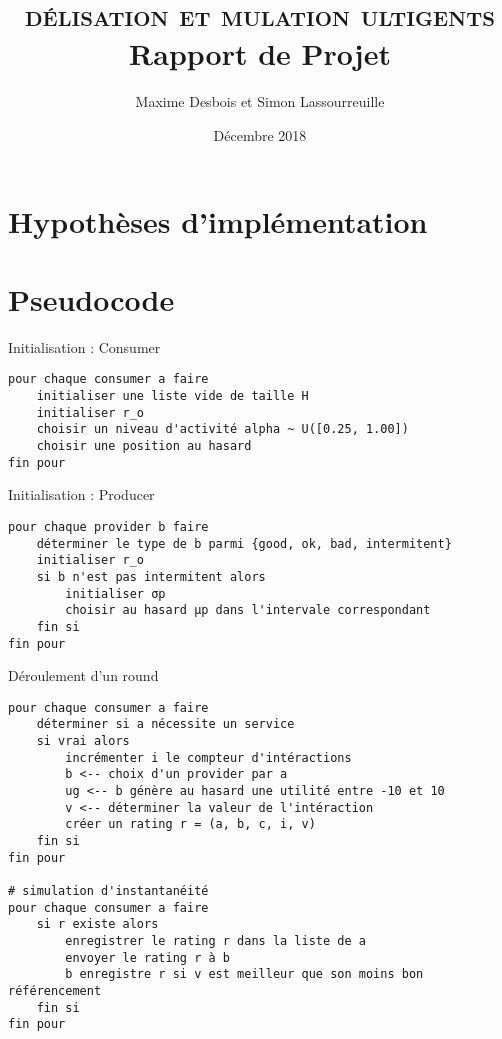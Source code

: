 \documentclass{article}
\title{%
    \vspace*{\fill}
    \textbf{\scshape \tcol{Mo}délisation et \tcol{Si}mulation \tcol{M}ulti\tcol{A}gents}\\
    Rapport de Projet
}
\author{
    Maxime Desbois et Simon Lassourreuille
}
\date{
    Décembre 2018
    \vspace*{\fill}
}
\begin{document}
\maketitle

\clearpage

\section{Hypothèses d'implémentation}%
\label{sec:hypotheses_d_implementation}



\section{Pseudocode}

\begin{pseudocode}{Initialisation : Consumer}
\begin{verbatim}
pour chaque consumer a faire
    initialiser une liste vide de taille H
    initialiser r_o
    choisir un niveau d'activité alpha ~ U([0.25, 1.00])
    choisir une position au hasard
fin pour
\end{verbatim}
\end{pseudocode}

\begin{pseudocode}{Initialisation : Producer}
\begin{verbatim}
pour chaque provider b faire
    déterminer le type de b parmi {good, ok, bad, intermitent}
    initialiser r_o
    si b n'est pas intermitent alors
        initialiser σp
        choisir au hasard μp dans l'intervale correspondant
    fin si
fin pour
\end{verbatim}
\end{pseudocode}

\begin{pseudocode}{Déroulement d'un round}
\begin{verbatim}
pour chaque consumer a faire
    déterminer si a nécessite un service
    si vrai alors
        incrémenter i le compteur d'intéractions
        b <-- choix d'un provider par a
        ug <-- b génère au hasard une utilité entre -10 et 10
        v <-- déterminer la valeur de l'intéraction
        créer un rating r = (a, b, c, i, v)
    fin si
fin pour

# simulation d'instantanéité
pour chaque consumer a faire
    si r existe alors
        enregistrer le rating r dans la liste de a
        envoyer le rating r à b
        b enregistre r si v est meilleur que son moins bon référencement
    fin si
fin pour
\end{verbatim}
\end{pseudocode}
\end{document}
